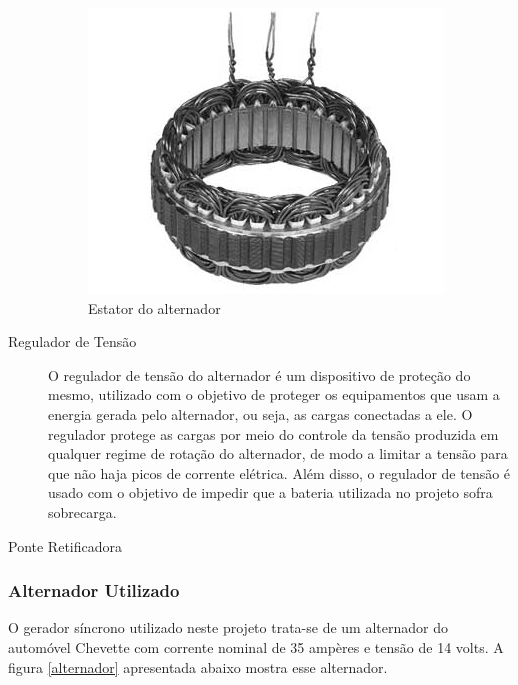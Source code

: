 \begin{description}
\begin{figure}[h]
	\centering
	\includegraphics[scale=1]		{figuras/estator_alternador.png}
	\caption{Estator do alternador}
	\label{estator-alternador}
\end{figure}


\item [Regulador de Tensão]

O regulador de tensão do alternador é um dispositivo de proteção do mesmo, utilizado com o objetivo de proteger os equipamentos que usam a energia gerada pelo alternador, ou seja, as cargas conectadas a ele. O regulador protege as cargas por meio do controle da tensão produzida em qualquer regime de rotação do alternador, de modo a limitar a tensão para que não haja picos de corrente elétrica. Além disso, o regulador de tensão é usado com o objetivo de impedir que a bateria utilizada no projeto sofra sobrecarga. 

\item [Ponte Retificadora]
\end{description}

\subsubsection{Alternador Utilizado}

O gerador síncrono utilizado neste projeto trata-se de um alternador do automóvel Chevette com corrente nominal de 35 ampères e tensão de 14 volts. A figura \ref{alternador} apresentada abaixo mostra esse alternador.


